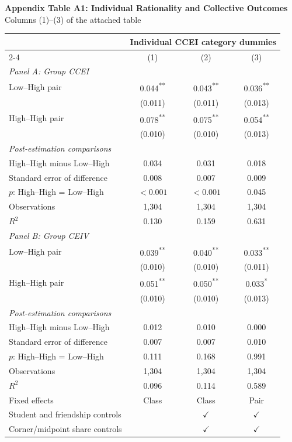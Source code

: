 \documentclass[11pt]{article}
\begin{document}
\clearpage
\normalsize
\setlength{\parskip}{3pt}
\begin{center}\large\textbf{Appendix Table A1: Individual Rationality and Collective Outcomes}\\
\normalsize Columns (1)--(3) of the attached table\end{center}
\begin{center}\small
\setlength{\tabcolsep}{14pt}
\renewcommand{\arraystretch}{1.12}

\begin{tabular}{lccc}
\toprule
& \multicolumn{3}{c}{Individual CCEI category dummies}\\
\cmidrule(lr){2-4}
& (1) & (2) & (3)\\
\midrule
\multicolumn{4}{l}{\textit{Panel A: Group CCEI}}\\[3pt]
Low--High pair & 0.044\textsuperscript{**} & 0.043\textsuperscript{**} & 0.036\textsuperscript{**}\\
 & (0.011) & (0.011) & (0.013)\\
High--High pair & 0.078\textsuperscript{**} & 0.075\textsuperscript{**} & 0.054\textsuperscript{**}\\
 & (0.010) & (0.010) & (0.013)\\
\midrule\multicolumn{4}{l}{\textit{Post-estimation comparisons}}\\[2pt]
High--High minus Low--High & 0.034 & 0.031 & 0.018\\
Standard error of difference & 0.008 & 0.007 & 0.009\\
$p$: High--High = Low--High & $<0.001$ & $<0.001$ & 0.045\\
\addlinespace
Observations & 1,304 & 1,304 & 1,304\\
$R^2$ & 0.130 & 0.159 & 0.631\\
\midrule
\multicolumn{4}{l}{\textit{Panel B: Group CEIV}}\\[3pt]
Low--High pair & 0.039\textsuperscript{**} & 0.040\textsuperscript{**} & 0.033\textsuperscript{**}\\
 & (0.010) & (0.010) & (0.011)\\
High--High pair & 0.051\textsuperscript{**} & 0.050\textsuperscript{**} & 0.033\textsuperscript{*}\\
 & (0.010) & (0.010) & (0.013)\\
\midrule\multicolumn{4}{l}{\textit{Post-estimation comparisons}}\\[2pt]
High--High minus Low--High & 0.012 & 0.010 & 0.000\\
Standard error of difference & 0.007 & 0.007 & 0.010\\
$p$: High--High = Low--High & 0.111 & 0.168 & 0.991\\
\addlinespace
Observations & 1,304 & 1,304 & 1,304\\
$R^2$ & 0.096 & 0.114 & 0.589\\
\midrule
Fixed effects & Class & Class & Pair\\
Student and friendship controls &  & $\checkmark$ & $\checkmark$\\
Corner/midpoint share controls &  & $\checkmark$ & $\checkmark$\\
\bottomrule
\end{tabular}
\end{center}
\end{document}
